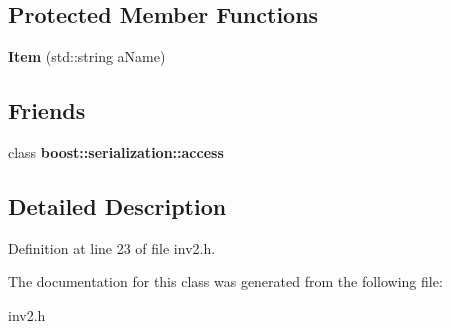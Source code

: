 \subsection*{Protected Member Functions}
\begin{DoxyCompactItemize}
\item 
\hypertarget{class_item_a98956a129a5a3c47ac8466306090df0c}{}\label{class_item_a98956a129a5a3c47ac8466306090df0c} 
{\bfseries Item} (std\+::string a\+Name)
\end{DoxyCompactItemize}
\subsection*{Friends}
\begin{DoxyCompactItemize}
\item 
\hypertarget{class_item_ac98d07dd8f7b70e16ccb9a01abf56b9c}{}\label{class_item_ac98d07dd8f7b70e16ccb9a01abf56b9c} 
class {\bfseries boost\+::serialization\+::access}
\end{DoxyCompactItemize}


\subsection{Detailed Description}


Definition at line 23 of file inv2.\+h.



The documentation for this class was generated from the following file\+:\begin{DoxyCompactItemize}
\item 
inv2.\+h\end{DoxyCompactItemize}
